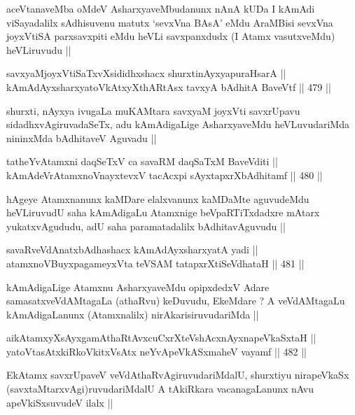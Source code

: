 \begin{artha}
aceVtanaveMba oMdeV AsharxyaveMbudanunx nAnA kUDa I kAmAdi
viSayadalilx sAdhisuvenu matutx `sevxVna BAsA' eMdu AraMBisi sevxVna
joyxVtiSA parxsavxpiti eMdu heVLi savxpanxdudx (I Atamx vasutxveMdu)
heVLiruvudu ||
\end{artha}

\begin{shl}
savxyaMjoyxVtiSaTxvXsididhxshacx shurxtinAyxyapuraHsarA || \\
kAmAdAyxsharxyatoVkAtxyX\s thARtAsx tavxyA bAdhitA BaveVtf ||  479 ||  
\end{shl}

\begin{artha}
shurxti, nAyxya ivugaLa muKAMtara savxyaM joyxVti savxrUpavu
sidadhxvAgiruvadaSeTx, adu kAmAdigaLige AsharxyaveMdu heVLuvudariMda
nininxMda bAdhitaveV Aguvadu ||
\end{artha}

\begin{shl}
tatheYvA\s \s tamxni daqSeTxV ca savaRM daqSaTxM BaveVditi || \\
kAmAdeVrAtamxnoV\s nayxtevxV tacAcxpi sAyxtapxrXbAdhitamf ||  480 ||  
\end{shl}

\begin{artha}
hAgeye Atamxnanunx kaMDare elalxvanunx kaMDaMte aguvudeMdu heVLiruvudU
saha kAmAdigaLu Atamxnige beVpaRTiTxdadxre mAtarx yukatxvAgududu, adU
saha paramatadalilx bAdhitavAguvudu ||
\end{artha}

\begin{shl}
savaRveVdAnatxbAdhashacx kAmAdAyxsharxyatA yadi ||  \\
atamxnoV\s BuyxpagameyxVta teVSAM tatapxrXtiSeVdhataH ||  481 ||  
\end{shl}

\begin{artha}
kAmAdigaLige Atamxnu AsharxyaveMdu opipxdedxV Adare
samasatxveVdAMtagaLa (athaRvu) keDuvudu, EkeMdare ? A veVdAMtagaLu
kAmAdigaLanunx (Atamxnalilx) nirAkarisiruvudariMda  ||
\end{artha}

\begin{shl}
aikAtamxyXsAyx\s \s gamAthaRtAvxcuCxrXteVshAcxnAyxnapeVkaSxtaH || \\
yatoV\s tasAtxkiRkoVkitxVsAtx neYvApeVkASxmaheV vayamf ||  482 ||  
\end{shl}

\begin{artha}
EkAtamx savxrUpaveV veVdAthaRvAgiruvudariMdalU, shurxtiyu nirapeVkaSx
(savxtaMtarxvAgi)ruvudariMdalU A tAkiRkara vacanagaLanunx nAvu
apeVkiSxsuvudeV ilalx ||
\end{artha}


